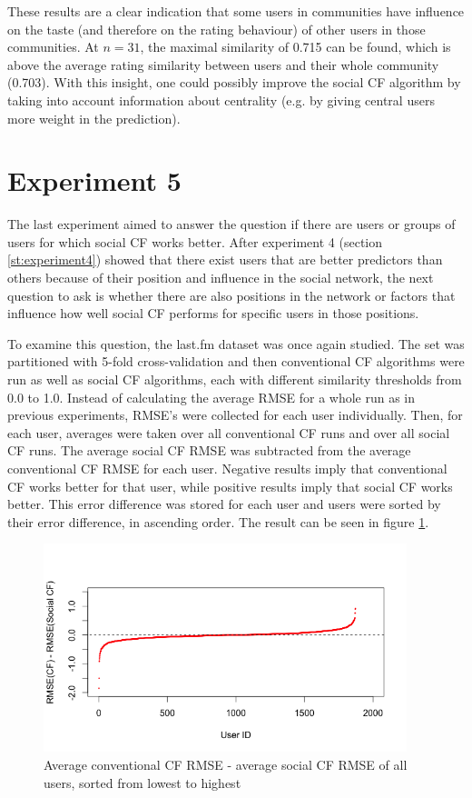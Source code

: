 These results are a clear indication that some users in communities have influence on the taste (and therefore on the rating behaviour) of other users in those communities. At $n=31$, the maximal similarity of 0.715 can be found, which is above the average rating similarity between users and their whole community (0.703). With this insight, one could possibly improve the social CF algorithm by taking into account information about centrality (e.g. by giving central users more weight in the prediction).
\section{Experiment 5}
\label{st:experiment5} The last experiment aimed to answer the question if there are users or groups of users for which social CF works better. After experiment 4 (section \ref{st:experiment4}) showed that there exist users that are better predictors than others because of their position and influence in the social network, the next question to ask is whether there are also positions in the network or factors that influence how well social CF performs for specific users in those positions.
\newline

To examine this question, the last.fm dataset was once again studied. The set was partitioned with 5-fold cross-validation and then conventional CF algorithms were run as well as social CF algorithms, each with different similarity thresholds from 0.0 to 1.0. Instead of calculating the average RMSE for a whole run as in previous experiments, RMSE's were collected for each user individually. Then, for each user, averages were taken over all conventional CF runs and over all social CF runs. The average social CF RMSE was subtracted from the average conventional CF RMSE for each user. Negative results imply that conventional CF works better for that user, while positive results imply that social CF works better. This error difference was stored for each user and users were sorted by their error difference, in ascending order. The result can be seen in figure \ref{f:usererrors}.

\begin{figure}[!h]
\includegraphics[width=400px]{./4-experiments/figures/UserErrors.png}
\caption{Average conventional CF RMSE - average social CF RMSE of all users, sorted from lowest to highest}
\label{f:usererrors}
\end{figure}

